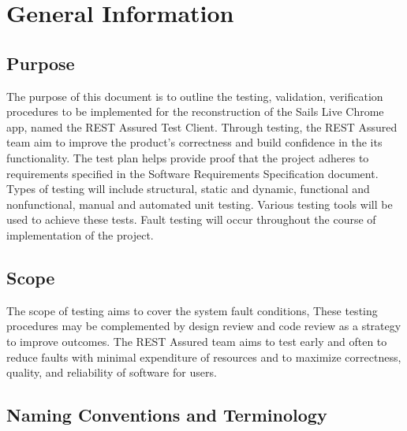 \documentclass[12pt, titlepage]{article}
\begin{document}
\section{General Information}
	
\subsection{Purpose}
The purpose of this document is to outline the testing, validation, verification procedures to be implemented for the reconstruction of the Sails Live Chrome app, named the REST Assured Test Client. Through testing, the REST Assured team aim to improve the product’s correctness and build confidence in the its functionality. The test plan helps provide proof that the project adheres to requirements specified in the Software Requirements Specification document. 
Types of testing will include structural, static and dynamic, functional and nonfunctional, manual and automated unit testing. Various testing tools will be used to achieve these tests. Fault testing will occur throughout the course of implementation of the project.

\subsection{Scope}
The scope of testing aims to cover the system fault conditions, These testing procedures may be complemented by design review and code review as a strategy to improve outcomes. The REST Assured team aims to test early and often to reduce faults with minimal expenditure of resources and to maximize correctness, quality, and reliability of software for users.

\subsection{Naming Conventions and Terminology}
\end{document}
